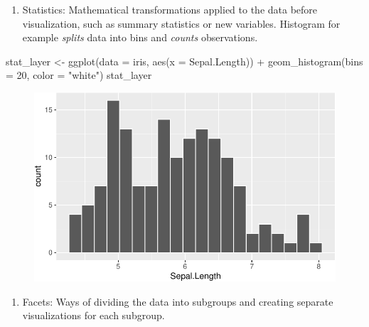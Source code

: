 \documentclass[
  letterpaper,
]{book}
\newenvironment{Shaded}{\begin{snugshade}}{\end{snugshade}}
\newcommand{\AttributeTok}[1]{\textcolor[rgb]{0.40,0.45,0.13}{#1}}
\newcommand{\DecValTok}[1]{\textcolor[rgb]{0.68,0.00,0.00}{#1}}
\newcommand{\FunctionTok}[1]{\textcolor[rgb]{0.28,0.35,0.67}{#1}}
\newcommand{\NormalTok}[1]{\textcolor[rgb]{0.00,0.23,0.31}{#1}}
\newcommand{\OtherTok}[1]{\textcolor[rgb]{0.00,0.23,0.31}{#1}}
\newcommand{\SpecialCharTok}[1]{\textcolor[rgb]{0.37,0.37,0.37}{#1}}
\newcommand{\StringTok}[1]{\textcolor[rgb]{0.13,0.47,0.30}{#1}}
\providecommand{\tightlist}{%
  \setlength{\itemsep}{0pt}\setlength{\parskip}{0pt}}\usepackage{longtable,booktabs,array}
\begin{document}
\begin{enumerate}
\def\labelenumi{\arabic{enumi}.}
\setcounter{enumi}{4}
\tightlist
\item
  Statistics: Mathematical transformations applied to the data before
  visualization, such as summary statistics or new variables. Histogram
  for example \emph{splits} data into bins and \emph{counts}
  observations.
\end{enumerate}

\begin{Shaded}
\begin{Highlighting}[]
\NormalTok{stat\_layer }\OtherTok{\textless{}{-}} \FunctionTok{ggplot}\NormalTok{(}\AttributeTok{data =}\NormalTok{ iris, }\FunctionTok{aes}\NormalTok{(}\AttributeTok{x =}\NormalTok{ Sepal.Length)) }\SpecialCharTok{+} 
  \FunctionTok{geom\_histogram}\NormalTok{(}\AttributeTok{bins =} \DecValTok{20}\NormalTok{, }\AttributeTok{color =} \StringTok{"white"}\NormalTok{)}
\NormalTok{stat\_layer}
\end{Highlighting}
\end{Shaded}

\begin{figure}[H]

{\centering \includegraphics{./data_viz_files/figure-pdf/unnamed-chunk-10-1.pdf}

}

\end{figure}

\begin{enumerate}
\def\labelenumi{\arabic{enumi}.}
\setcounter{enumi}{5}
\tightlist
\item
  Facets: Ways of dividing the data into subgroups and creating separate
  visualizations for each subgroup.
\end{enumerate}
\end{document}
